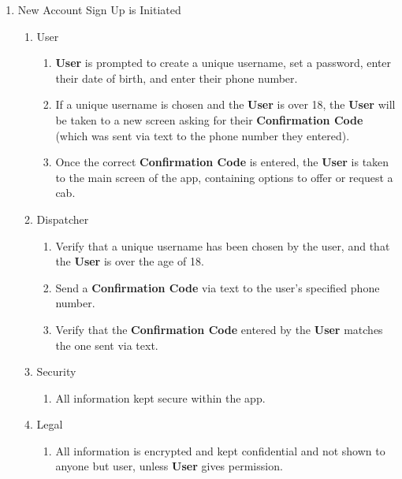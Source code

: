 \documentclass[english]{article}
\begin{document}
\begin{enumerate}[{BE}1.]
	\item New Account Sign Up is Initiated	
	\begin{enumerate}[{VP2}.1]
		\item User
			\begin{enumerate}
				\item \textbf{User} is prompted to create a unique username, set a password, enter their date of birth, and enter their phone number.
				\item If a unique username is chosen and the \textbf{User} is over 18, the \textbf{User} will be taken to a new screen asking for their \textbf{Confirmation Code} (which was sent via text to the phone number they entered).
				\item Once the correct \textbf{Confirmation Code} is entered, the \textbf{User} is taken to the main screen of the app, containing options to offer or request a cab. 
			\end{enumerate}
		\item Dispatcher
			\begin{enumerate}
				\item Verify that a unique username has been chosen by the user, and that the \textbf{User} is over the age of 18.
				\item Send a \textbf{Confirmation Code} via text to the user's specified phone number.
				\item Verify that the \textbf{Confirmation Code} entered by the \textbf{User} matches the one sent via text.
			\end{enumerate}
		\item Security
			\begin{enumerate}
				\item All information kept secure within the app.
			\end{enumerate}
		\item Legal
			\begin{enumerate}
				\item All information is encrypted and kept confidential and not shown to anyone but user, unless \textbf{User} gives permission.
			\end{enumerate}
	\end{enumerate}


\end{enumerate}
\end{document}
